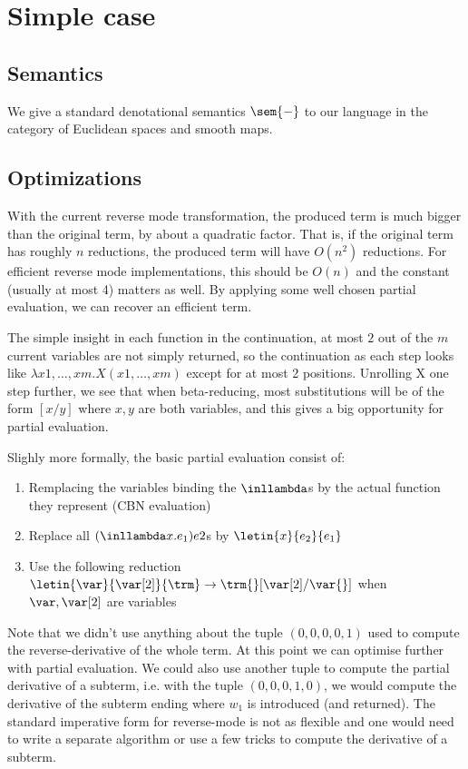\section{Simple case}

\subsection{Semantics} 
\label{sub:Semantics}

We give a standard denotational semantics $\sem{-}$ to our language in the category of Euclidean spaces and smooth maps.

\subsection{Optimizations}

With the current reverse mode transformation, the produced term is much bigger than the original term, by about a quadratic factor. 
That is, if the original term has roughly $n$ reductions, the produced term will have $O(n^2)$ reductions. 
For efficient reverse mode implementations, this should be $O(n)$ and the constant (usually at most 4) matters as well.
By applying some well chosen partial evaluation, we can recover an efficient term.

The simple insight in each function in the continuation, at most $2$ out of the $m$ current variables are not simply returned, so the continuation as each step looks like
$\lambda x1,\ldots,xm.X(x1,\ldots,xm)$ except for at most 2 positions.
Unrolling X one step further, we see that when beta-reducing, most substitutions will be of the form $[x/y]$ where $x,y$ are both variables, 
and this gives a big opportunity for partial evaluation.

Slighly more formally, the basic partial evaluation consist of:
\begin{enumerate}
	\item Remplacing the variables binding the $\inllambda$s by the actual function they represent (CBN evaluation)
	\item Replace all $(\inllambda x.e_1)e2$s by $\letin{x}{e_2}{e_1}$
	\item Use the following reduction $\letin{\var}{\var[2]}{\trm}\to\trm{}[\var[2]/\var{}]$ when $\var,\var[2]$ are variables
\end{enumerate}

Note that we didn't use anything about the tuple $(0,0,0,0,1)$ used to compute the reverse-derivative of the whole term. 
At this point we can optimise further with partial evaluation. We could also use another tuple to compute the partial derivative of a subterm, 
i.e. with the tuple $(0,0,0,1,0)$, we would compute the derivative of the subterm ending where $w_1$ is introduced (and returned). 
The standard imperative form for reverse-mode is not as flexible and one would need to write a separate algorithm 
or use a few tricks to compute the derivative of a subterm. 

